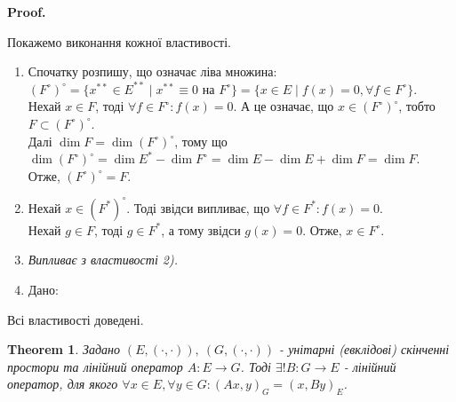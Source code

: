 \documentclass[a4paper, 10pt]{article}
\makeatletter
\theoremstyle{theoremdd}
\newtheorem{theorem}{Theorem}[subsection]
\renewenvironment{proof}[1][Proof.\\]{\par
\pushQED{\hfill \qed}%
\normalfont \topsep6\p@\@plus6\p@\relax
\trivlist
\item\relax
{\bfseries
#1\@addpunct{.}}\hspace\labelsep\ignorespaces
}{%
\popQED\endtrivlist\@endpefalse
}
\makeatother
\begin{document}
\begin{proof}
Покажемо виконання кожної властивості.
\begin{enumerate}[topsep=-\parskip, wide=0pt, label={\arabic*)}]
\item Спочатку розпишу, що означає ліва множина:\\
$(F^\circ)^\circ = \{ x^{**} \in E^{**} \mid x^{**} \equiv 0 \text{ на } F^\circ \} = \{x \in E \mid f(x) = 0, \forall f \in F^\circ\}$.\\
Нехай $x \in F$, тоді $\forall f \in F^\circ : f(x) = 0$. А це означає, що $x \in (F^\circ)^\circ$, тобто $F \subset (F^\circ)^\circ$.\\
Далі $\dim F = \dim (F^\circ)^\circ$, тому що $\dim (F^{\circ})^\circ = \dim E^* - \dim F^\circ = \dim E - \dim E + \dim F = \dim F$.\\
Отже, $(F^{\circ})^{\circ} = F$.
\item Нехай $x \in (F^*)^\circ$. Тоді звідси випливає, що $\forall f \in F^*: f(x) = 0$.\\
Нехай $g \in F$, тоді $g \in F^*$, а тому звідси $g(x) = 0$. Отже, $x \in F^\circ$.
\item \textit{Випливає з властивості 2).}
\item Дано:
\end{enumerate}
Всі властивості доведені.
\end{proof}
\fi

\begin{theorem} Задано $(E,(\cdot,\cdot)),\ (G,(\cdot,\cdot))$ - унітарні (евклідові) скінченні простори та лінійний оператор $A \colon E \to G$. Тоді $\exists! B \colon G \to E$ - лінійний оператор, для якого $\forall x \in E, \forall y \in G: (Ax,y)_G = (x,By)_E$.
\end{theorem}
\end{document}
